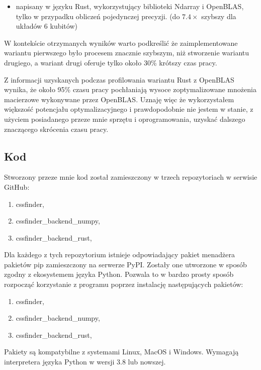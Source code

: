 \documentclass[11pt, a4paper]{article}
\begin{document}
\begin{sloppypar}
\begin{itemize}
      \item napisany w języku Rust, wykorzystujący biblioteki Ndarray i OpenBLAS, tylko w
        przypadku obliczeń pojedynczej precyzji. (do $7.4\times$ szybszy dla układów 6 kubitów)
    \end{itemize}
    W kontekście otrzymanych wyników warto podkreślić że zaimplementowane wariantu pierwszego
    było procesem znacznie szybszym, niż stworzenie wariantu drugiego, a wariant drugi oferuje
    tylko około 30\% krótszy czas pracy.

    Z informacji uzyskanych podczas profilowania wariantu Rust z OpenBLAS wynika, że około
    95\% czasu pracy pochłaniają wysoce zoptymalizowane mnożenia macierzowe wykonywane
    przez OpenBLAS. Uznaję więc że wykorzystałem większość potencjału optymalizacyjnego i
    prawdopodobnie nie jestem w stanie, z użyciem posiadanego przeze mnie sprzętu i
    oprogramowania, uzyskać dalszego znaczącego skrócenia czasu pracy.

    \subsection{Kod}
    Stworzony przeze mnie kod został zamieszczony w trzech repozytoriach w serwisie GitHub:
    \begin{enumerate}
      \item cssfinder\cite{CSSFinder_New},

      \item cssfinder\_backend\_numpy\cite{CSSFinder_New_Numpy},

      \item cssfinder\_backend\_rust\cite{CSSFinder_New_Rust},
    \end{enumerate}

    Dla każdego z tych repozytorium istnieje odpowiadający pakiet menadżera pakietów pip
    zamieszczony na serwerze PyPI. Zostały one utworzone w sposób zgodny z ekosystemem
    języka Python. Pozwala to w bardzo prosty sposób rozpocząć korzystanie z programu poprzez
    instalację następujących pakietów:
    \begin{enumerate}
      \item cssfinder\cite{CSSFinder_New_PyPI},

      \item cssfinder\_backend\_numpy\cite{CSSFinder_New_Numpy_PyPI},

      \item cssfinder\_backend\_rust\cite{CSSFinder_New_Rust_PyPI},
    \end{enumerate}

    Pakiety są kompatybilne z systemami Linux, MacOS i Windows. Wymagają interpretera języka
    Python w wersji 3.8 lub nowszej.
  \end{sloppypar}
  \newpage
  \begin{sloppypar}
    \medskip


    \printbibliography
    [heading=bibintoc, title={Odwołania}]
  \end{sloppypar}
\end{document}
